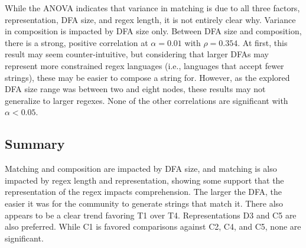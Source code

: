 While the ANOVA indicates that variance in matching is due to all three factors, representation, DFA size, and regex length, it is not entirely clear why. Variance in composition is impacted by DFA size only.
Between DFA size and composition, there is a strong, positive correlation at $\alpha = 0.01$ with $\rho = 0.354$.
At first, this result may seem counter-intuitive, but considering that larger DFAs may represent more constrained regex languages (i.e., languages that accept fewer strings), these may be easier to compose a string for.
However, as the explored DFA size range was between two and eight nodes, these results may not generalize to larger regexes.
None of the other correlations are significant with $\alpha < 0.05$.%



\subsection{Summary}
Matching and composition are impacted by DFA size, and matching is also impacted by regex length and representation, showing some support that the representation of the regex impacts comprehension.
The larger the DFA, the easier it was for the community to generate strings that match it.
There also appears to be a clear trend favoring T1 over T4. Representations D3 and C5 are also preferred. While C1 is favored comparisons against C2, C4, and C5, none are significant.

